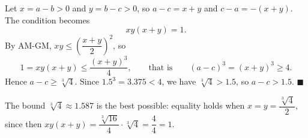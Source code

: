 Let $x=a-b>0$ and $y=b-c>0$, so $a-c=x+y$ and $c-a=-(x+y)$. The condition becomes
\[
xy(x+y)=1 .
\]
By AM-GM, $xy\le\left(\dfrac{x+y}{2}\right)^2$, so
\[
1=xy(x+y)\le\dfrac{(x+y)^3}{4},\qquad\text{that is}\qquad (a-c)^3=(x+y)^3\ge4 .
\]
Hence $a-c\ge\sqrt[3]{4}$. Since $1.5^3=3.375<4$, we have $\sqrt[3]{4}>1.5$, so $a-c>1.5$. $\blacksquare$

The bound $\sqrt[3]{4}\approx1.587$ is the best possible: equality holds when $x=y=\dfrac{\sqrt[3]{4}}{2}$, since then $xy(x+y)=\dfrac{\sqrt[3]{16}}{4}\cdot\sqrt[3]{4}=\dfrac{4}{4}=1$.
